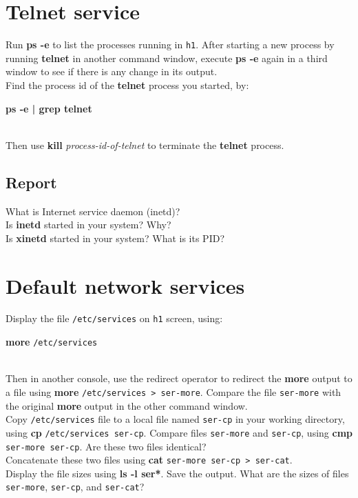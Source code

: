 \documentclass[10pt,a4paper]{article}
\numberwithin{equation}{section}
\numberwithin{figure}{section}
\numberwithin{table}{section}
\begin{document}
    \section{Telnet service}
    Run \textbf{ps -e} to list the processes running in \texttt{h1}.
    After starting a new process by running \textbf{telnet} in another command window, execute \textbf{ps -e} again in a third window to see if there is any change in its output. \\
    Find the process id of the \textbf{telnet} process you started, by: \\
    \centerline{\textbf{ps -e | grep telnet}} \\
    Then use \textbf{kill} \textit{process-id-of-telnet} to terminate the \textbf{telnet} process.
    \subsection*{Report}
    What is Internet service daemon (inetd)? \\
    Is \textbf{inetd} started in your system?
    Why? \\
    Is \textbf{xinetd} started in your system? What is its PID? \\

    \section{Default network services}
    Display the file \texttt{/etc/services} on \texttt{h1} screen, using: \\
    \centerline{\textbf{more} \texttt{/etc/services}} \\
    Then in another console, use the redirect operator to redirect the \textbf{more} output to
    a file using \textbf{more} \texttt{/etc/services > ser-more}. Compare the file \texttt{ser-more} with the original \textbf{more} output in the other command window. \\
    Copy \texttt{/etc/services} file to a local file named \texttt{ser-cp} in your working directory,
    using \textbf{cp} \texttt{/etc/services ser-cp}. Compare files \texttt{ser-more} and \texttt{ser-cp}, using \textbf{cmp} \texttt{ser-more ser-cp}. Are these two files identical?\\
    Concatenate these two files using \textbf{cat} \texttt{ser-more ser-cp > ser-cat}. \\
    Display the file sizes using \textbf{ls -l ser*}. Save the output. What are the sizes of files \texttt{ser-more}, \texttt{ser-cp}, and \texttt{ser-cat}?
\end{document}
